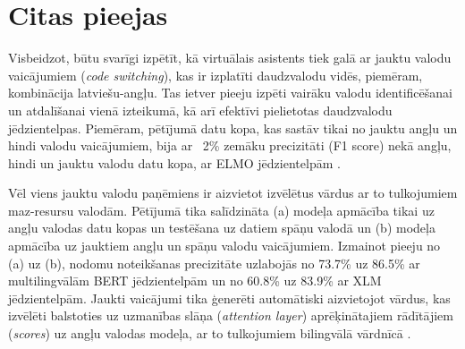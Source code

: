 \section{Citas pieejas}

Visbeidzot, būtu svarīgi izpētīt, kā virtuālais asistents tiek galā ar jauktu valodu vaicājumiem (\textit{code switching}), kas ir izplatīti daudzvalodu vidēs, piemēram, kombinācija latviešu-angļu. Tas ietver pieeju izpēti vairāku valodu identificēšanai un atdalīšanai vienā izteikumā, kā arī efektīvi pielietotas daudzvalodu jēdzientelpas. Piemēram, pētījumā datu kopa, kas sastāv tikai no jauktu angļu un hindi valodu vaicājumiem, bija ar ~2\% zemāku precizitāti (F1 score) nekā angļu, hindi un jauktu valodu datu kopa, ar ELMO jēdzientelpām \cite{jayarao2018}.

Vēl viens jauktu valodu paņēmiens ir aizvietot izvēlētus vārdus ar to tulkojumiem maz-resursu valodām. Pētījumā \cite{liu2020} tika salīdzināta (a) modeļa apmācība tikai uz angļu valodas datu kopas un testēšana uz datiem spāņu valodā un (b) modeļa apmācība uz jauktiem angļu un spāņu valodu vaicājumiem. Izmainot pieeju no (a) uz (b), nodomu noteikšanas precizitāte uzlabojās no 73.7\% uz 86.5\% ar multilingvālām BERT jēdzientelpām un no 60.8\% uz 83.9\% ar XLM jēdzientelpām. Jaukti vaicājumi tika ģenerēti automātiski aizvietojot vārdus, kas izvēlēti balstoties uz uzmanības slāņa (\textit{attention layer}) aprēķinātajiem rādītājiem (\textit{scores}) uz angļu valodas modeļa, ar to tulkojumiem bilingvālā vārdnīcā \cite{liu2020}.

